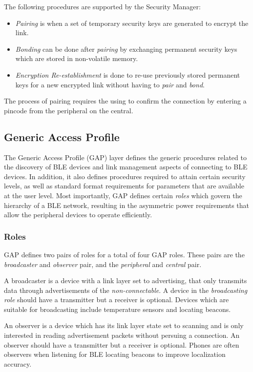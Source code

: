 The following procedures are supported by the Security Manager:
\begin{itemize}
    \item \textit{Pairing} is when a set of temporary security keys are generated to encrypt the link.
    \item \textit{Bonding} can be done after \textit{pairing} by exchanging permanent security keys which are stored in non-volatile memory.
    \item \textit{Encryption Re-establishment} is done to re-use previously stored permanent keys for a new encrypted link without having to \textit{pair} and \textit{bond}.
\end{itemize}

The process of pairing requires the using to confirm the connection by entering a pincode from the peripheral on the central.

\subsection{Generic Access Profile}
The Generic Access Profile (GAP) layer defines the generic procedures related to the discovery of BLE devices and link management aspects of connecting to BLE devices. In addition, it also defines procedures required to attain certain security levels, as well as standard format requirements for parameters that are available at the user level. Most importantly, GAP defines certain \textit{roles} which govern the hierarchy of a BLE network, resulting in the asymmetric power requirements that allow the peripheral devices to operate efficiently.

\subsubsection{Roles}
GAP defines two pairs of roles for a total of four GAP roles. These pairs are the \textit{broadcaster} and \textit{observer} pair, and the \textit{peripheral} and \textit{central} pair.

A broadcaster is a device with a link layer set to advertising, that only transmits data through advertisements of the \textit{non-connectable}. A device in the \textit{broadcasting role} should have a transmitter but a receiver is optional. Devices which are suitable for broadcasting include temperature sensors and locating beacons.

An observer is a device which has its link layer state set to scanning and is only interested in reading advertisement packets without persuing a connection. An observer should have a transmitter but a receiver is optional. Phones are often observers when listening for BLE locating beacons to improve localization accuracy. 

